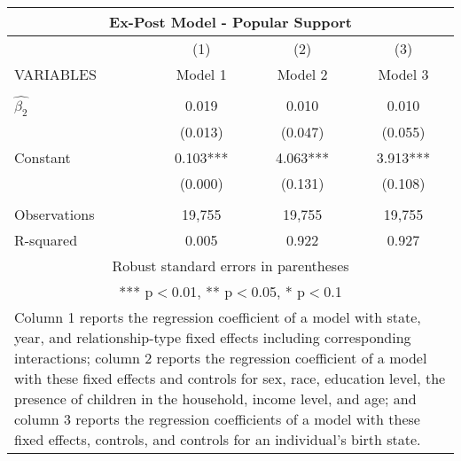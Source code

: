 \begin{tabular}{lccc}
\multicolumn{4}{c}{Ex-Post Model - Popular Support} \\ \hline
 & (1) & (2) & (3) \\
VARIABLES & Model 1 & Model 2 & Model 3 \\ \hline
 &  &  &  \\
$\hat{\beta_2}$ & 0.019 & 0.010 & 0.010 \\
 & (0.013) & (0.047) & (0.055) \\
Constant & 0.103*** & 4.063*** & 3.913*** \\
 & (0.000) & (0.131) & (0.108) \\
 &  &  &  \\
Observations & 19,755 & 19,755 & 19,755 \\
 R-squared & 0.005 & 0.922 & 0.927 \\ \hline
\multicolumn{4}{c}{ Robust standard errors in parentheses} \\
\multicolumn{4}{c}{ *** p$<$0.01, ** p$<$0.05, * p$<$0.1} \\
\multicolumn{4}{p{0.8\linewidth}}{\small Column 1 reports the regression coefficient of a model with state, year, and relationship-type fixed effects including corresponding interactions; column 2 reports the regression coefficient of a model with these fixed effects and controls for sex, race, education level, the presence of children in the household, income level, and age; and column 3 reports the regression coefficients of a model with these fixed effects, controls, and controls for an individual’s birth state.} \\
\end{tabular}
